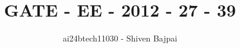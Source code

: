 \documentclass[journal]{IEEEtran}
\begin{document}
\onecolumn

\vspace{3cm}

\renewcommand{\thefigure}{\theenumi}
\renewcommand{\thetable}{\theenumi}

\title{GATE - EE - 2012 - 27 - 39}
\author{ai24btech11030 - Shiven Bajpai}
\maketitle

\iffalse
\begin{multicols}{4}
\begin{enumerate}
    \item 
    \item 
    \item 
    \item 
\end{enumerate}
\end{multicols}
\fi
\end{document}
